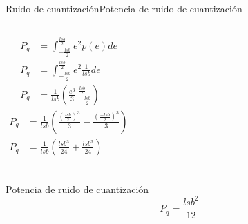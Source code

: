  \begin{frame}{Ruido de cuantización}{Potencia de ruido de cuantización}
    \begin{columns}[onlytextwidth]
       \begin{align*}
          P_q &= \int^\frac{lsb}{2}_{-\frac{lsb}{2}} e^2 p(e) de \\
          P_q &= \int^\frac{lsb}{2}_{-\frac{lsb}{2}} e^2 \frac{1}{lsb} de \\
          P_q &= \frac{1}{lsb}\left(\frac{e^3}{3} \Big\rvert^{\frac{lsb}{2}}_{-\frac{lsb}{2}}\right)
       \end{align*}
       \begin{align*}
          P_q &= \frac{1}{lsb}\left(\frac{(\frac{lsb}{2})^3}{3} - \frac{(\frac{-lsb}{2})^3}{3}\right)\\
          P_q &= \frac{1}{lsb} \left(\frac{lsb^3}{24} + \frac{lsb^3}{24}\right) \\
       \end{align*}
    \end{columns}
    \begin{block}{Potencia de ruido de cuantización}
       \begin{equation*}
          P_q = \frac{lsb^2}{12}
       \end{equation*}
    \end{block}
    \vspace{1cm}
    \vfill
 \end{frame}

